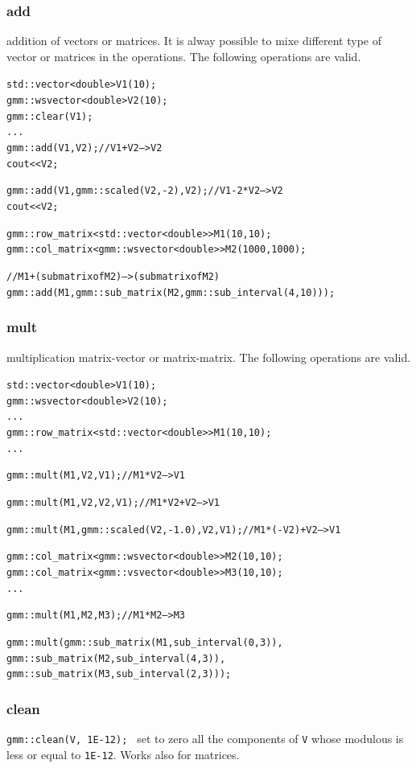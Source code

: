 \documentclass[11pt,a4paper]{article}
\begin{document}
\subsubsection{add}
addition of vectors or matrices. It is alway possible to mixe different type of vector or matrices in the operations. The following operations are valid.
\begin{alltt}
  std::vector<double> V1(10);
  gmm::wsvector<double> V2(10);
  gmm::clear(V1);
  ...
  gmm::add(V1, V2); // V1 + V2 --> V2
  cout << V2;

  gmm::add(V1, gmm::scaled(V2, -2), V2); // V1 - 2* V2 --> V2
  cout << V2;

  gmm::row_matrix< std::vector<double> > M1(10, 10);
  gmm::col_matrix< gmm::wsvector<double> > M2(1000, 1000);

  // M1 + (sub matrix of M2) ---> (sub matrix of M2)
  gmm::add(M1, gmm::sub_matrix(M2, gmm::sub_interval(4,10)));
\end{alltt}

\subsubsection{mult}
multiplication matrix-vector or matrix-matrix. The following operations are valid.
\begin{alltt}
  std::vector<double> V1(10);
  gmm::wsvector<double> V2(10);
  ...
  gmm::row_matrix< std::vector<double> > M1(10, 10);
  ...

  gmm::mult(M1, V2, V1);  // M1 * V2 --> V1

  gmm::mult(M1, V2, V2, V1);  // M1 * V2 + V2 --> V1

  gmm::mult(M1, gmm::scaled(V2, -1.0), V2, V1);  // M1 * (-V2) + V2 --> V1

  gmm::col_matrix< gmm::wsvector<double> > M2(10, 10);
  gmm::col_matrix< gmm::vsvector<double> > M3(10, 10);
  ...
  
  gmm::mult(M1, M2, M3); // M1 * M2 ---> M3
  
  gmm::mult(gmm::sub_matrix(M1, sub_interval(0, 3)),
            gmm::sub_matrix(M2, sub_interval(4, 3)),
            gmm::sub_matrix(M3, sub_interval(2, 3)));

\end{alltt}

\subsubsection{clean}
 {\tt gmm::clean(V, 1E-12); } set to zero all the components of {\tt V} whose modulous is less or equal to {\tt  1E-12}. Works also for matrices.
\end{document}
